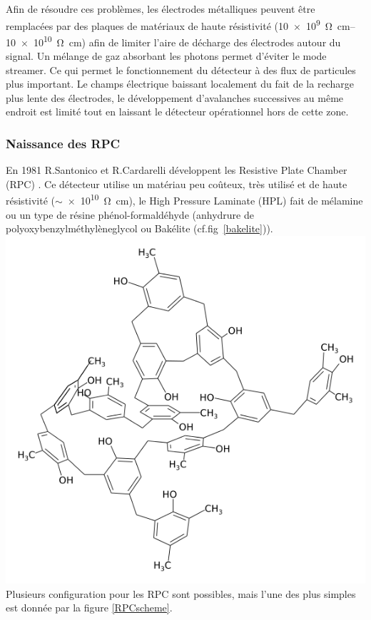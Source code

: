 Afin de résoudre ces problèmes, les électrodes métalliques peuvent être remplacées par des plaques de matériaux de haute résistivité (\SIrange{10e9}{10e10}{\ohm\centi\meter}) afin de limiter l'aire de décharge des électrodes autour du signal. Un mélange de gaz absorbant les photons permet d'éviter le mode streamer. Ce qui permet le fonctionnement du détecteur à des flux de particules plus important. Le champs électrique baissant localement du fait de la recharge plus lente des électrodes, le développement d'avalanches successives au même endroit est limité tout en laissant le détecteur opérationnel hors de cette zone.
\vspace{-0.3cm}
\subsubsection{Naissance des RPC}
\vspace{-0.3cm}
En 1981 R.Santonico et R.Cardarelli développent les Resistive Plate Chamber (RPC) \cite{Santonico:1981sc} \cite{CARDARELLI198820}. Ce détecteur utilise un matériau peu coûteux, très utilisé et de haute résistivité ($\sim$\SI{e10}{\ohm\centi\meter}), le High Pressure Laminate (HPL) fait de mélamine ou un type de résine phénol-formaldéhyde (anhydrure de polyoxybenzylméthylèneglycol ou Bakélite (cf.fig~\ref{bakelite})). 
\marginpar
{
	\centering
	\includegraphics[width=\marginparwidth]{RPC/bakelite.png}
	\label{bakelite}
}
Plusieurs configuration pour les RPC sont possibles, mais l'une des plus simples est donnée par la figure \ref{RPCscheme}.

